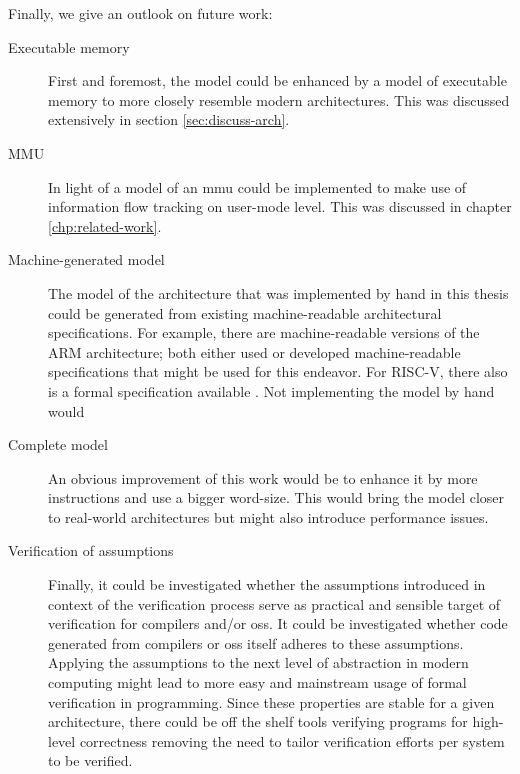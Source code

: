 Finally, we give an outlook on future work:
\begin{description}
    \item[Executable memory] First and foremost, the model could be enhanced by a model of executable memory to more closely resemble modern architectures.
    This was discussed extensively in section \ref{sec:discuss-arch}.
    \item[MMU] In light of \cite{KhakpourSD13} a model of an \gls{mmu} could be implemented to make use of information flow tracking on user-mode level.
    This was discussed in chapter \ref{chp:related-work}.
    \item[Machine-generated model] The model of the architecture that was implemented by hand in this thesis could be generated from existing machine-readable architectural specifications.
    For example, there are machine-readable versions of the ARM architecture; both \cite{Reid17,Fox02} either used or developed machine-readable specifications that might be used for this endeavor.
    For RISC-V, there also is a formal specification available \cite{RiscvSpecFormal}.
    Not implementing the model by hand would 
    \item[Complete model] An obvious improvement of this work would be to enhance it by more instructions and use a bigger word-size.
    This would bring the model closer to real-world architectures but might also introduce performance issues.
    \item[Verification of assumptions] Finally, it could be investigated whether the assumptions introduced in context of the verification process serve as practical and sensible target of verification for compilers and/or \glspl{os}.
    It could be investigated whether code generated from compilers or \glspl{os} itself adheres to these assumptions.
    Applying the assumptions to the next level of abstraction in modern computing might lead to more easy and mainstream usage of formal verification in programming.
    Since these properties are stable for a given architecture, there could be off the shelf tools verifying programs for high-level correctness removing the need to tailor verification efforts per system to be verified.
\end{description}

